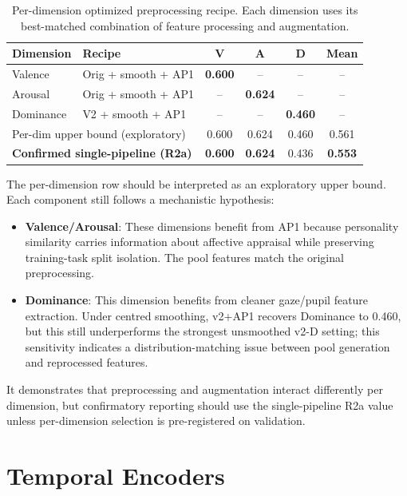 \documentclass[sigconf,review,anonymous]{acmart}
\newcommand{\best}[1]{\textbf{\textcolor{bestcol}{#1}}}
\begin{document}
\begin{table}[t]
\caption{Per-dimension optimized preprocessing recipe. Each dimension uses its
best-matched combination of feature processing and augmentation.}
\label{tab:perdim_recipe}
\centering
\setlength{\tabcolsep}{4pt}
\small
\begin{tabular}{llcccc}
\toprule
\textbf{Dimension} & \textbf{Recipe} & \textbf{V} & \textbf{A} & \textbf{D} & \textbf{Mean} \\
\midrule
Valence & Orig + smooth + AP1 & \best{0.600} & -- & -- & -- \\
Arousal & Orig + smooth + AP1 & -- & \best{0.624} & -- & -- \\
Dominance & V2 + smooth + AP1 & -- & -- & \best{0.460} & -- \\
\midrule
\multicolumn{2}{l}{Per-dim upper bound (exploratory)} & 0.600 & 0.624 & 0.460 & 0.561 \\
\multicolumn{2}{l}{\best{Confirmed single-pipeline (R2a)}} & \best{0.600} & \best{0.624} & 0.436 & \best{0.553} \\
\bottomrule
\end{tabular}
\end{table}

The per-dimension row should be interpreted as an exploratory upper bound.
Each component still follows a mechanistic hypothesis:
\begin{itemize}[leftmargin=1.2em,itemsep=1pt,topsep=2pt]
  \item \textbf{Valence/Arousal}: These dimensions benefit from AP1 because
  personality similarity carries information about affective appraisal
  while preserving training-task split isolation. The pool features match the
  original preprocessing.
  \item \textbf{Dominance}: This dimension benefits from cleaner gaze/pupil
  feature extraction. Under centred smoothing, v2+AP1 recovers Dominance to
  0.460, but this still underperforms the strongest unsmoothed v2-D setting;
  this sensitivity indicates a distribution-matching issue between pool
  generation and reprocessed features.
\end{itemize}

It demonstrates that preprocessing and augmentation interact differently
per dimension, but confirmatory reporting should use the single-pipeline
R2a value unless per-dimension selection is pre-registered on validation.

\section{Temporal Encoders}
\label{sec:temporal}
\end{document}
